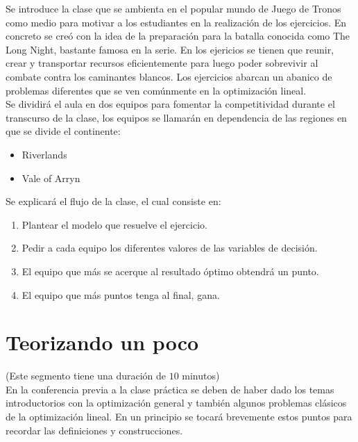 \documentclass[a4paper,10pt,twocolumn]{article}
\theoremstyle{theorem}
\theoremstyle{definition}
\theoremstyle{remark}
\begin{document}
Se introduce la clase que se ambienta en el popular mundo de Juego de Tronos como medio para motivar a los estudiantes en la realización de los ejercicios. En concreto se creó con la idea de la preparación para la batalla conocida como The Long Night, bastante famosa en la serie. En los ejericios se tienen que reunir, crear y transportar recursos eficientemente para luego poder sobrevivir al combate contra los caminantes blancos. Los ejercicios abarcan un abanico de problemas diferentes que se ven comúnmente en la optimización lineal.\\

Se dividirá el aula en dos equipos para fomentar la competitividad durante el transcurso de la clase, los equipos se llamarán en dependencia de las regiones en que se divide el continente:

\begin{itemize}

	\item Riverlands
	\item Vale of Arryn

\end{itemize}

Se explicará el flujo de la clase, el cual consiste en:

\begin{enumerate}

	\item Plantear el modelo que resuelve el ejercicio.
	\item Pedir a cada equipo los diferentes valores de las variables de decisión.
	\item El equipo que más se acerque al resultado óptimo obtendrá un punto.
	\item El equipo que más puntos tenga al final, gana.

\end{enumerate}

\section{Teorizando un poco}\label{sec:teoria}
(Este segmento tiene una duración de $10$ minutos)\\

En la conferencia previa a la clase práctica se deben de haber dado los temas introductorios con la optimización general y también algunos problemas clásicos de la optimización lineal. En un principio se tocará brevemente estos puntos para recordar las definiciones y construcciones.
\end{document}
